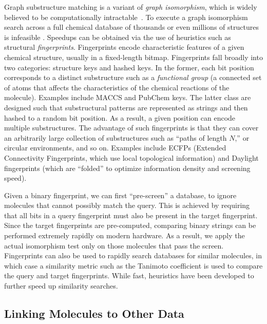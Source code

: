 \documentclass{sig-alternate}
\begin{document}
Graph substructure matching is a variant of \emph{graph isomorphism},
which is widely believed to be computationally
intractable~\cite{cordella2001}. To execute a graph isomorphism search
across a full chemical database of thousands or even millions of
structures is infeasible \cite{Weininger:2011ly}. Speedups can be
obtained via the use of heuristics such as structural
\emph{fingerprints}. Fingerprints encode characteristic features of a
given chemical structure, usually in a fixed-length
bitmap. Fingerprints fall broadly into two categories: structure keys
and hashed keys. In the former, each bit position corresponds to a
distinct substructure such as a \emph{functional group} (a connected set of atoms that affects the characteristics of the chemical reactions of the molecule). Examples
include MACCS and PubChem keys. The latter class are designed such
that substructural patterns are represented as strings and then hashed
to a random bit position. As a result, a given position can encode
multiple substructures. The advantage of such fingerprints is that
they can cover an arbitrarily large collection of substructures such
as ``paths of length $N$,'' or circular environments, and so on. Examples
include ECFPs (Extended Connectivity Fingerprints, which use local topological information) and Daylight fingerprints (which are ``folded'' to optimize information density and screening speed).

Given a binary fingerprint, we can first ``pre-screen'' a database, to
ignore molecules that cannot possibly match the query. This is
achieved by requiring that all bits in a query fingerprint must also
be present in the target fingerprint. Since the target fingerprints
are pre-computed, comparing binary strings can be performed extremely
rapidly on modern hardware. As a result, we apply the actual
isomorphism test only on those molecules that pass the
screen. Fingerprints can also be used to rapidly search databases for
similar molecules, in which case a similarity metric such as the
Tanimoto coefficient is used to compare the query and target
fingerprints. While fast, heuristics have been developed
\cite{Swamidass:2007ve} to further
speed up similarity searches.

\subsection{Linking Molecules to Other Data}
\label{sec:prof-ident}
\end{document}
